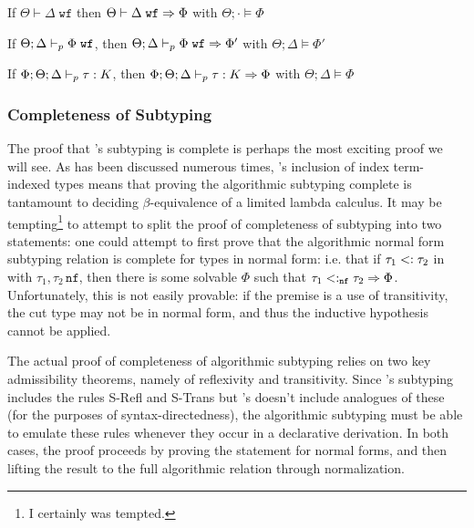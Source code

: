 \begin{theorem}
If $\Theta \vdash \Delta \; \texttt{wf}$ then $\Theta \vdash \Delta \; \texttt{wf} \Rightarrow \Phi$ with $\Theta ; \cdot \vDash \Phi$
\label{thm:idx-ctx-wf-compl}
\end{theorem}

\begin{theorem}
If $\Theta ; \Delta \vdash_p \Phi \; \texttt{wf}$, then $\Theta ; \Delta \vdash_p \Phi \; \texttt{wf} \Rightarrow \Phi'$ with $\Theta ; \Delta \vDash \Phi'$
\label{thm:constr-compl}
\end{theorem}

\begin{theorem}
If $\Phi;\Theta;\Delta \vdash_p \tau : K$, then $\Phi;\Theta;\Delta \vdash_p \tau : K \Rightarrow \Phi$ with $\Theta ; \Delta \vDash \Phi$
\label{thm:kind-compl}
\end{theorem}

\subsubsection{Completeness of Subtyping}
The proof that \bilambdaamor's subtyping is complete is perhaps the most exciting proof we will see. As has been discussed numerous times, \dlambdaamor's inclusion of index term-indexed types means that proving the algorithmic subtyping complete is tantamount to deciding $\beta$-equivalence of a limited lambda calculus. It may be tempting\footnote{
I certainly was tempted.
} to attempt to split the proof of completeness of subtyping into two statements: one could attempt to first prove that the algorithmic normal form subtyping relation is complete for types in normal form: i.e. that if $\tau_1 <: \tau_2$ in \dlambdaamor with $\tau_1,\tau_2 \, \texttt{nf}$, then there is some solvable $\Phi$ such that $\tau_1 <:_{\texttt{nf}} \tau_2 \Rightarrow \Phi$. Unfortunately, this is not easily provable: if the premise is a use of transitivity, the cut type may not be in normal form, and thus the inductive hypothesis cannot be applied.

The actual proof of completeness of algorithmic subtyping relies on two key admissibility theorems, namely of reflexivity and transitivity. Since \dlambdaamor's subtyping includes the rules S-Refl and S-Trans but \bilambdaamor's doesn't include analogues of these (for the purposes of syntax-directedness), the algorithmic subtyping must be able to emulate these rules whenever they occur in a declarative derivation. In both cases, the proof proceeds by proving the statement for normal forms, and then lifting the result to the full algorithmic relation through normalization.

